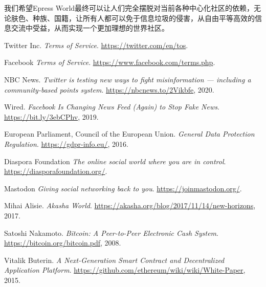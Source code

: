 \documentclass[12pt,a4paper]{extarticle}
\begin{document}
    我们希望Epress World最终可以让人们完全摆脱对当前各种中心化社区的依赖，无论肤色、种族、国籍，让所有人都可以免于信息垃圾的侵害，从自由平等高效的信息交流中受益，从而实现一个更加理想的世界社区。
\begin{thebibliography}{9}

Twitter Inc.
\textit{Terms of Service}.
\url{https://twitter.com/en/tos}.

Facebook
\textit{Terms of Service}.
\url{https://www.facebook.com/terms.php}.

NBC News.
\textit{Twitter is testing new ways to fight misinformation — including a community-based points system}.
\url{https://nbcnews.to/2Vikbfe}, 2020.

Wired.
\textit{Facebook Is Changing News Feed (Again) to Stop Fake News}.
\url{https://bit.ly/3ebCPhv}, 2019.

European Parliament, Council of the European Union.
\textit{General Data Protection Regulation}.
\url{https://gdpr-info.eu/}, 2016.

Diaspora Foundation
\textit{The online social world where you are in control}.
\url{https://diasporafoundation.org/}.

Mastodon
\textit{Giving social networking back to you}.
\url{https://joinmastodon.org/}.

Mihai Alisie.
\textit{Akasha World}.
\url{https://akasha.org/blog/2017/11/14/new-horizons}, 2017.

Satoshi Nakamoto.
\textit{Bitcoin: A Peer-to-Peer Electronic Cash System}. 
\url{https://bitcoin.org/bitcoin.pdf}, 2008.

Vitalik Buterin.
\textit{A Next-Generation Smart Contract and Decentralized Application Platform}.
\url{https://github.com/ethereum/wiki/wiki/White-Paper}, 2015.

\end{thebibliography}
\end{document}
